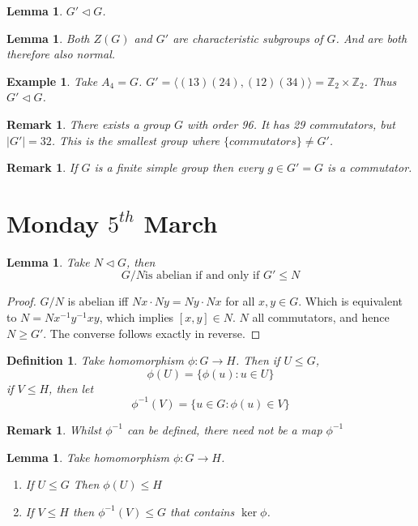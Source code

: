 \documentclass[a4paper,10pt]{article}
\newcommand{\ZZ}{\mathbb{Z}}
\newtheorem{Def}[thm]{Definition}
\newtheorem{eg}[thm]{Example}
\newtheorem{Lem}[thm]{Lemma}
\newtheorem{rem}[thm]{Remark}
\begin{document}
\begin{Lem}
$G ' \triangleleft G$.
\end{Lem}

\begin{Lem}
Both $Z(G)$ and $G'$ are characteristic subgroups of $G$. And are both therefore also normal. 
\end{Lem}


\begin{eg}
Take $A_4 = G$. $G' = \langle (13)(24), (12)(34) \rangle = \ZZ_2 \times \ZZ_2$. Thus $G' \triangleleft G$.
\end{eg}

\begin{rem}
There exists a group $G$ with order 96. It has 29 commutators, but $|G'| = 32$. This is the smallest group where $\{commutators\} \neq G'$.
\end{rem}
\begin{rem}
If $G$ is a finite simple group then every $g \in G' = G$ is a commutator.
\end{rem}


\newpage
\section{Monday $5^{th}$ March}

\begin{Lem}
Take $N \triangleleft G$, then 
\[ G / N \text{is abelian if and only if } G' \leq N \] 
\end{Lem}

\begin{proof}
$G/N$ is abelian iff $Nx \cdot Ny = Ny \cdot Nx$ for all $x,y \in G$. Which is equivalent to $N = Nx^{-1}y^{-1}xy$, which implies $[x,y] \in N$. $N$ all commutators, and hence $N \geq G'$. The converse follows exactly in reverse.
\end{proof}
\begin{Def}
Take homomorphism $\phi : G \rightarrow H$. Then if $U \leq G$,
\[ \phi(U) = \{ \phi(u) : u \in U \} \]
if $V \leq H$, then let
\[ \phi^{-1} (V) = \{ u \in G : \phi(u) \in V \} \]
\end{Def}

\begin{rem}
Whilst $\phi^{-1}$ can be defined, there need not be a map $\phi^{-1}$
\end{rem}

\begin{Lem}
Take homomorphism $\phi : G \rightarrow H$.
\begin{enumerate}
\item  If $U \leq G$ Then $\phi(U) \leq H$
\item If $V \leq H$ then $\phi^{-1}(V) \leq G$ that contains $\ker \phi$. 
\end{enumerate}

\end{Lem}
\end{document}
